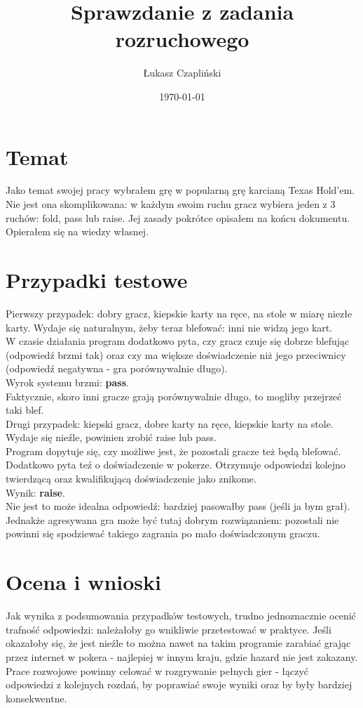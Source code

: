 \documentclass[11pt,wide]{mwart}
\title{Sprawzdanie z zadania rozruchowego}
\author{Łukasz Czapliński}
\date{\today}
\begin{document}
\maketitle
\section{Temat}
Jako temat swojej pracy wybrałem grę w popularną grę karcianą Texas Hold'em. Nie jest ona skomplikowana: w każdym swoim ruchu gracz wybiera jeden z 3 ruchów: fold, pass lub raise. 
Jej zasady pokrótce opisałem na końcu dokumentu.
Opierałem się na wiedzy własnej.
\section{Przypadki testowe}
Pierwszy przypadek: dobry gracz, kiepskie karty na ręce, na stole w miarę niezłe karty.
Wydaje się naturalnym, żeby teraz blefować: inni nie widzą jego kart.\\
W czasie działania program dodatkowo pyta, czy gracz czuje się dobrze blefując (odpowiedź brzmi tak) oraz czy ma większe doświadczenie niż jego przeciwnicy (odpowiedź negatywna - gra porównywalnie długo).\\
Wyrok systemu brzmi: \textbf{pass}.\\
Faktycznie, skoro inni gracze grają porównywalnie długo, to mogliby przejrzeć taki blef.\\
\indent Drugi przypadek: kiepski gracz, dobre karty na ręce, kiepskie karty na stole. Wydaje się nieźle, powinien zrobić raise lub pass.\\
Program dopytuje się, czy możliwe jest, że pozostali gracze też będą blefować. Dodatkowo pyta teź o doświadczenie w pokerze. Otrzymuje odpowiedzi kolejno twierdzącą oraz kwalifikującą doświadczenie jako znikome.\\
Wynik: \textbf{raise}.\\
Nie jest to może idealna odpowiedź: bardziej pasowałby pass (jeśli ja bym grał). Jednakże agresywana gra może być tutaj dobrym rozwiązaniem: pozostali nie powinni się spodziewać takiego zagrania po mało doświadczonym graczu.\\
\section{Ocena i wnioski}
Jak wynika z podsumowania przypadków testowych, trudno jednoznacznie ocenić trafność odpowiedzi: należałoby go wnikliwie przetestować w praktyce. Jeśli okazałoby się, że jest nieźle to można nawet na takim programie zarabiać grając przez internet w pokera - najlepiej w innym kraju, gdzie hazard nie jest zakazany.\\
Prace rozwojowe powinny celować w rozgrywanie pełnych gier - łączyć odpowiedzi z kolejnych rozdań, by poprawiać swoje wyniki oraz by były bardziej konsekwentne. 
\pagebreak
\end{document}
